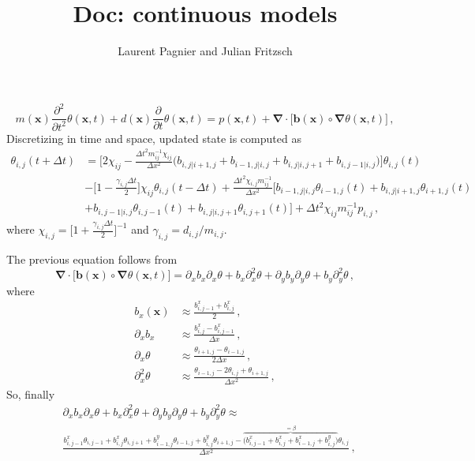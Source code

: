 \documentclass[notitlepage]{revtex4-2}
\begin{document}
\title{Doc: continuous models}
\author{Laurent Pagnier and Julian Fritzsch}
\maketitle


\begin{equation}
m(\bm x)\frac{\partial^2}{\partial t^2}\theta(\bm x,t)+d(\bm x)\frac{\partial}{\partial t}\theta(\bm x,t)=p(\bm x,t)+\bm\nabla\cdot\big[\bm b(\bm x)\circ\bm\nabla\theta(\bm x,t)\big]\,,
\end{equation}
Discretizing in time and space, updated state is computed as 
\begin{align}
\theta_{i,j}(t+\Delta t) &= 
\bigg[2\chi_{ij} -\frac{\Delta t^2 m_{ij}^{-1}\chi_{ij}}{\Delta x^2}\Big(b_{i,j|i+1,j}+b_{i-1,j|i,j}+b_{i,j|i,j+1}+b_{i,j-1|i,j}\Big)\bigg]\theta_{i,j}(t)\nonumber\\
&-\Big[1-\frac{\gamma_{i,j}\Delta t}{2}\Big]\chi_{ij}\theta_{i,j}(t-\Delta t) +\frac{\Delta t^2 \chi_{i,j}m_{ij}^{-1}}{\Delta x^2}\bigg[b_{i-1,j|i,j}\theta_{i-1,j}(t)+b_{i,j|i+1,j}\theta_{i+1,j}(t)\nonumber\\
&+b_{i,j-1|i,j}\theta_{i,j-1}(t)
+b_{i,j|i,j+1}\theta_{i,j+1}(t)\bigg] + \Delta t^2 \chi_{ij} m_{ij}^{-1}p_{i,j}\,,
\end{align}
where $\chi_{i,j}=\Big[1+\frac{\gamma_{i,j}\Delta t}{2}\Big]^{-1}$ and $\gamma_{i,j}=d_{i,j}/m_{i,j}$.

The previous equation follows from
\begin{equation}
\bm\nabla\cdot\big[\bm b(\bm x)\circ\bm\nabla\theta(\bm x,t)\big]=\partial_xb_x\partial_x\theta+b_x\partial_x^2\theta +\partial_yb_y\partial_y\theta+b_y\partial_y^2\theta\,,
\end{equation}
where
\begin{align}
b_x(\bm x)&\approx\frac{b^x_{i,j-1}+b^x_{i,j}}{2}\,,\\
\partial_xb_x&\approx\frac{b^x_{i,j}-b^x_{i,j-1}}{\Delta x}\,,\\
\partial_x\theta&\approx\frac{\theta_{i+1,j}-\theta_{i-1,j}}{2\Delta x}\,,\\
\partial_x^2\theta&\approx\frac{\theta_{i-1,j}-2\theta_{i,j}+\theta_{i+1,j}}{\Delta x^2}\,,
\end{align}
So, finally
\begin{align}
&\partial_xb_x\partial_x\theta+b_x\partial_x^2\theta +\partial_yb_y\partial_y\theta+b_y\partial_y^2\theta\approx\\
&\frac{b^x_{i,j-1}\theta_{i,j-1}+b^x_{i,j}\theta_{i,j+1}+b^y_{i-1,j}\theta_{i-1,j}+b^y_{i,j}\theta_{i+1,j}-\overbrace{\big(b^x_{i,j-1}+b^x_{i,j}+ b^x_{i-1,j}+b^y_{i,j}\big)}^{=\beta}\theta_{i,j}}{\Delta x^2}\,,
\end{align}
\end{document}
